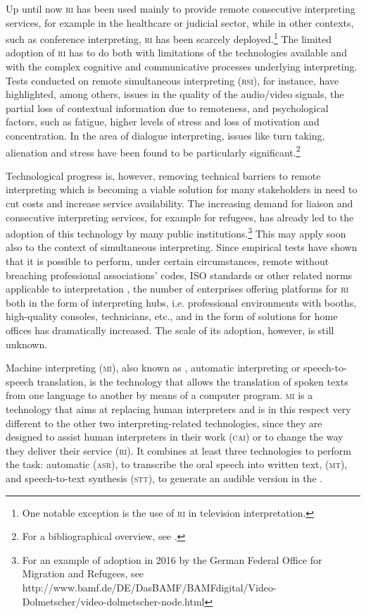 \documentclass[output=paper]{langsci/langscibook}
\begin{document}
Up until now \textsc{ri} has been used mainly to provide remote consecutive interpreting services, for example in the healthcare or judicial sector, while in other contexts, such as conference interpreting, \textsc{ri} has been scarcely deployed.\footnote{One notable exception is the use of \textsc{ri} in television interpretation.} The limited adoption of \textsc{ri} has to do both with limitations of the technologies available and with the complex cognitive and communicative processes underlying interpreting. Tests conducted on remote simultaneous interpreting (\textsc{rsi}), for instance, have highlighted, among others, issues in the quality of the audio/video signals, the partial loss of contextual information due to remoteness, and psychological factors, such as fatigue, higher levels of stress and loss of motivation and concentration. In the area of dialogue interpreting, issues like turn taking, alienation and stress have been found to be particularly significant.\footnote{For a bibliographical overview, see \citet{Andres2009}.}
 
Technological progress is, however, removing technical barriers to remote interpreting which is becoming a viable solution for many stakeholders in need to cut costs and increase service availability. The increasing demand for liaison and consecutive interpreting services, for example for refugees, has already led to the adoption of this technology by many public institutions.\footnote{For an example of adoption in 2016 by the German Federal Office for Migration and Refugees, see http://www.bamf.de/DE/DasBAMF/BAMFdigital/Video-Dolmetscher/video-dolmetscher-node.html} This may apply soon also to the context of simultaneous interpreting. Since empirical tests have shown that it is possible to perform, under certain circumstances, remote  without breaching professional associations’ codes, ISO standards or other related norms applicable to interpretation \citep[202]{Causo2011b}, the number of enterprises offering platforms for \textsc{ri} both in the form of interpreting hubs, i.e. professional environments with booths, high-quality consoles, technicians, etc., and in the form of solutions for home offices has dramatically increased. The scale of its adoption, however, is still unknown.   
 
Machine interpreting (\textsc{mi}), also known as , automatic interpreting or speech-to-speech translation, is the technology that allows the translation of spoken texts from one language to another by means of a computer program. \textsc{mi} is a technology that aims at replacing human interpreters and is in this respect very different to the other two interpreting-related technologies, since they are designed to assist human interpreters in their work (\textsc{cai}) or to change the way they deliver their service (\textsc{ri}). It combines at least three technologies to perform the task: automatic  (\textsc{asr}), to transcribe the oral speech into written text,  (\textsc{mt}), and speech-to-text synthesis (\textsc{stt}), to generate an audible version in the . 
 
\end{document}
